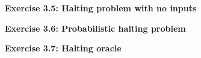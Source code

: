 \documentclass{article}
\begin{document}
\bigskip

\begin{framed}
    \noindent \textbf{Exercise 3.5: Halting problem with no inputs}
    
    \medskip
    
    
\end{framed}

\bigskip

\begin{framed}
    \noindent \textbf{Exercise 3.6: Probabilistic halting problem}
    
    \medskip
    
    
\end{framed}

\bigskip

\begin{framed}
    \noindent \textbf{Exercise 3.7: Halting oracle}
    
    \medskip
    
    
\end{framed}

\bigskip
\end{document}
